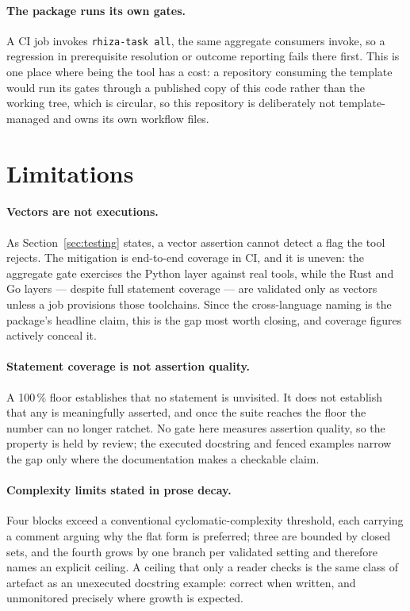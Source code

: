\documentclass[11pt,a4paper]{article}
\begin{document}
\paragraph{The package runs its own gates.} A CI job invokes \texttt{rhiza-task all}, the
same aggregate consumers invoke, so a regression in prerequisite resolution or outcome
reporting fails there first. This is one place where being the tool has a cost: a repository
consuming the template would run its gates through a published copy of this code rather
than the working tree, which is circular, so this repository is deliberately not
template-managed and owns its own workflow files.

\section{Limitations}
\label{sec:limitations}

\paragraph{Vectors are not executions.} As Section~\ref{sec:testing} states, a vector
assertion cannot detect a flag the tool rejects. The mitigation is end-to-end coverage in
CI, and it is uneven: the aggregate gate exercises the Python layer against real tools,
while the Rust and Go layers --- despite full statement coverage --- are validated only as
vectors unless a job provisions those toolchains. Since the cross-language naming is the
package's headline claim, this is the gap most worth closing, and coverage figures actively
conceal it.

\paragraph{Statement coverage is not assertion quality.} A 100\,\% floor establishes that
no statement is unvisited. It does not establish that any is meaningfully asserted, and once
the suite reaches the floor the number can no longer ratchet. No gate here measures
assertion quality, so the property is held by review; the executed docstring and fenced
examples narrow the gap only where the documentation makes a checkable claim.

\paragraph{Complexity limits stated in prose decay.} Four blocks exceed a conventional
cyclomatic-complexity threshold, each carrying a comment arguing why the flat form is
preferred; three are bounded by closed sets, and the fourth grows by one branch per
validated setting and therefore names an explicit ceiling. A ceiling that only a reader
checks is the same class of artefact as an unexecuted docstring example: correct when
written, and unmonitored precisely where growth is expected.
\end{document}
